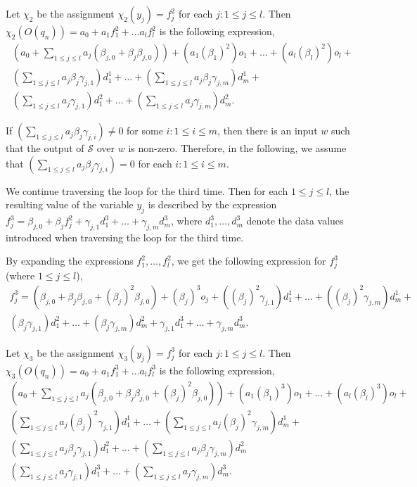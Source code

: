 \documentclass[runningheads,a4paper]{llncs}
\def\Ss{{\mathcal{S} }}
\begin{document}
Let $\chi_2$ be the assignment $\chi_2(y_j)=f^2_j$ for each $j: 1\le j \le l$.
Then $\chi_2(O(q_n)) = a_0+ a_1 f^2_1 + \dots a_l f^2_l$ is the following expression,
\[
\begin{array}{l}
(a_0 + \sum \limits_{1 \le j \le l} a_j (\beta_{j,0} + \beta_{j} \beta_{j,0})) +  (a_1 (\beta_1)^2) o_1 + \dots + (a_l (\beta_l)^2) o_l + \\
 (\sum \limits_{1 \le j \le l} a_j \beta_{j}\gamma_{j,1}) d^1_1 + \dots + (\sum \limits_{1 \le j \le l} a_j \beta_{j}\gamma_{j,m}) d^1_m + \\
(\sum \limits_{1 \le j \le l} a_j \gamma_{j,1}) d^2_1 + \dots + (\sum \limits_{1 \le j \le l} a_j \gamma_{j,m}) d^2_m.
\end{array}
\]

If $(\sum \limits_{1 \le j \le l} a_j \beta_j\gamma_{j,i}) \neq 0$ for some $i: 1 \le i \le m$, then there is an input $w$ such that the output of $\Ss$ over $w$ is non-zero. Therefore, in the following, we assume that $(\sum \limits_{1 \le j \le l} a_j \beta_j\gamma_{j,i}) = 0$ for each $i: 1 \le i \le m$.


We continue traversing the loop for the third time. Then for each $1 \le j \le l$,  the resulting value of the variable $y_{j}$ is described by the expression $f^3_{j} = \beta_{j,0} + \beta_{j} f^2_j  + \gamma_{j,1} d^3_1 + \dots + \gamma_{j,m} d^3_m$, where $d^3_1, \dots, d^3_m$ denote the data values introduced when traversing the loop for the third time. 

By expanding the expressions $f^2_1,\dots,f^2_l$, we get the following expression for $f^3_{j}$ (where $1\le j \le l$),
\[
\begin{array}{l}
f^3_{j} = (\beta_{j,0} + \beta_{j} \beta_{j,0} + (\beta_j)^2 \beta_{j,0}) + (\beta_{j})^3 o_{j} +
((\beta_{j})^2\gamma_{j,1}) d^1_1 +\dots + ((\beta_{j})^2\gamma_{j,m}) d^1_m  + \\
(\beta_j \gamma_{j,1}) d^2_1 + \dots + (\beta_j \gamma_{j,m}) d^2_m + \gamma_{j,1} d^3_1 + \dots + \gamma_{j,m} d^3_m.
\end{array}
\]

Let $\chi_3$ be the assignment $\chi_3(y_j)=f^3_j$ for each $j: 1\le j \le l$.
Then $\chi_3(O(q_n)) = a_0+ a_1 f^3_1 + \dots a_l f^3_l$ is the following expression,
\[
\begin{array}{l}
(a_0 + \sum \limits_{1 \le j \le l} a_j (\beta_{j,0} + \beta_{j} \beta_{j,0} + (\beta_j)^2 \beta_{j,0})) +  (a_1 (\beta_1)^3) o_1 + \dots + (a_l (\beta_l)^3) o_l + \\
 (\sum \limits_{1 \le j \le l} a_j (\beta_{j})^2\gamma_{j,1}) d^1_1 + \dots + (\sum \limits_{1 \le j \le l} a_j (\beta_{j})^2\gamma_{j,m}) d^1_m + \\
(\sum \limits_{1 \le j \le l} a_j \beta_j \gamma_{j,1}) d^2_1 + \dots + (\sum \limits_{1 \le j \le l} a_j \beta_j \gamma_{j,m}) d^2_m \\
(\sum \limits_{1 \le j \le l} a_j \gamma_{j,1}) d^3_1 + \dots + (\sum \limits_{1 \le j \le l} a_j \gamma_{j,m}) d^3_m. 
\end{array}
\]
\end{document}
